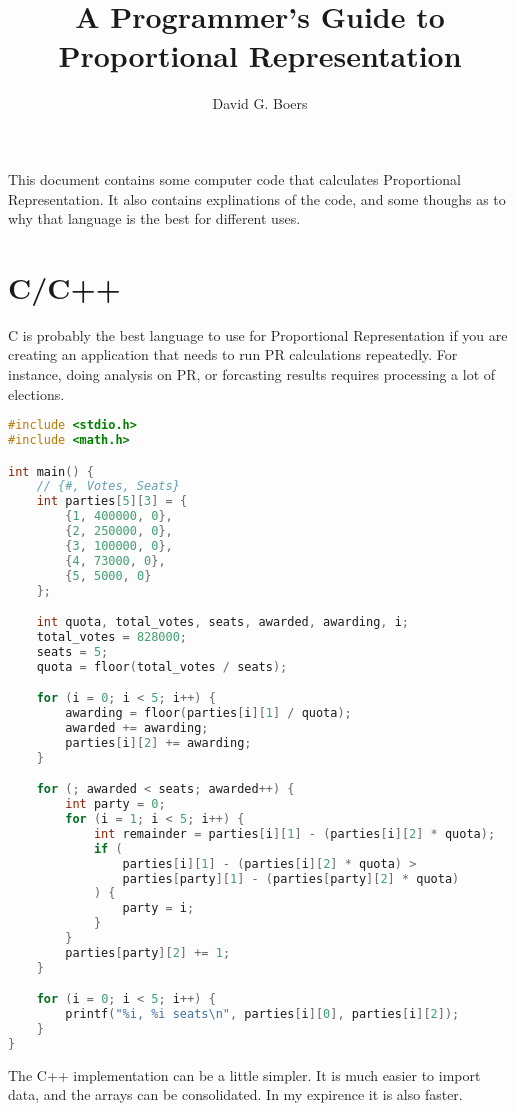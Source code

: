 \documentclass{article}
\title{A Programmer's Guide to Proportional Representation}
\author{David G. Boers}
\begin{document}
    \maketitle
    This document contains some computer code that calculates Proportional Representation. It also contains explinations of the code, and some thoughs as to why that language is the best for different uses. 
    
    \section{C/C++}
    C is probably the best language to use for Proportional Representation if you are creating an application that needs to run PR calculations repeatedly. For instance, doing analysis on PR, or forcasting results requires processing a lot of elections. 

    \begin{lstlisting}[language=C]
#include <stdio.h>
#include <math.h>

int main() {
    // {#, Votes, Seats}
    int parties[5][3] = {
        {1, 400000, 0},
        {2, 250000, 0},
        {3, 100000, 0},
        {4, 73000, 0},
        {5, 5000, 0}
    };

    int quota, total_votes, seats, awarded, awarding, i;
    total_votes = 828000;
    seats = 5;
    quota = floor(total_votes / seats);

    for (i = 0; i < 5; i++) {
        awarding = floor(parties[i][1] / quota);
        awarded += awarding;
        parties[i][2] += awarding;
    }

    for (; awarded < seats; awarded++) {
        int party = 0;
        for (i = 1; i < 5; i++) {
            int remainder = parties[i][1] - (parties[i][2] * quota);
            if (
                parties[i][1] - (parties[i][2] * quota) > 
                parties[party][1] - (parties[party][2] * quota)
            ) {
                party = i;
            }
        }
        parties[party][2] += 1;
    }

    for (i = 0; i < 5; i++) {
        printf("%i, %i seats\n", parties[i][0], parties[i][2]);
    }
}
    \end{lstlisting}

    The C++ implementation can be a little simpler. It is much easier to import data, and the arrays can be consolidated. In my expirence it is also faster.
\end{document}

